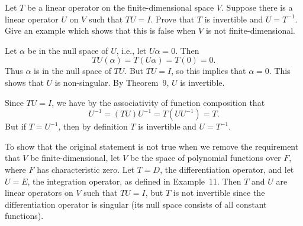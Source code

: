  Let $T$ be a linear operator on the finite-dimensional
space $V$. Suppose there is a linear operator $U$ on $V$ such that
$TU = I$. Prove that $T$ is invertible and $U = T^{-1}$. Give an
example which shows that this is false when $V$ is not
finite-dimensional.
\begin{solution}
  Let $\alpha$ be in the null space of $U$, i.e., let $U\alpha =
  0$. Then
  \begin{equation*}
    TU(\alpha) = T(U\alpha) = T(0) = 0.
  \end{equation*}
  Thus $\alpha$ is in the null space of $TU$. But $TU = I$, so this
  implies that $\alpha = 0$. This shows that $U$ is non-singular. By
  Theorem~9, $U$ is invertible.

  Since $TU = I$, we have by the associativity of function composition
  that
  \begin{equation*}
    U^{-1} = (TU)U^{-1} = T(UU^{-1}) = T.
  \end{equation*}
  But if $T = U^{-1}$, then by definition $T$ is invertible and
  $U = T^{-1}$.

  To show that the original statement is not true when we remove the
  requirement that $V$ be finite-dimensional, let $V$ be the space of
  polynomial functions over $F$, where $F$ has characteristic
  zero. Let $T = D$, the differentiation operator, and let $U = E$,
  the integration operator, as defined in Example~11. Then $T$ and $U$
  are linear operators on $V$ such that $TU = I$, but $T$ is not
  invertible since the differentiation operator is singular (its null
  space consists of all constant functions).
\end{solution}
